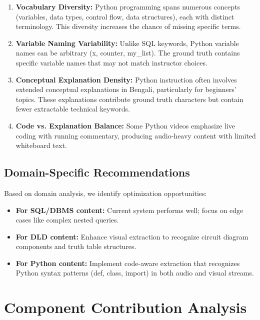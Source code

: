 \begin{enumerate}
    \item \textbf{Vocabulary Diversity:} Python programming spans numerous concepts (variables, data types, control flow, data structures), each with distinct terminology. This diversity increases the chance of missing specific terms.
    
    \item \textbf{Variable Naming Variability:} Unlike SQL keywords, Python variable names can be arbitrary (x, counter, my\_list). The ground truth contains specific variable names that may not match instructor choices.
    
    \item \textbf{Conceptual Explanation Density:} Python instruction often involves extended conceptual explanations in Bengali, particularly for beginners' topics. These explanations contribute ground truth characters but contain fewer extractable technical keywords.
    
    \item \textbf{Code vs. Explanation Balance:} Some Python videos emphasize live coding with running commentary, producing audio-heavy content with limited whiteboard text.
\end{enumerate}

\subsection{Domain-Specific Recommendations}

Based on domain analysis, we identify optimization opportunities:

\begin{itemize}
    \item \textbf{For SQL/DBMS content:} Current system performs well; focus on edge cases like complex nested queries.
    \item \textbf{For DLD content:} Enhance visual extraction to recognize circuit diagram components and truth table structures.
    \item \textbf{For Python content:} Implement code-aware extraction that recognizes Python syntax patterns (def, class, import) in both audio and visual streams.
\end{itemize}

\section{Component Contribution Analysis}

